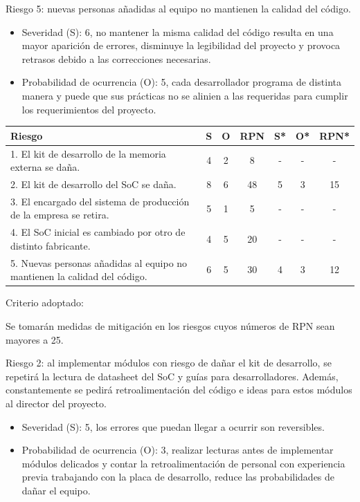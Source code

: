 \documentclass[
11pt, %
]{charter}
\begin{document}
Riesgo 5: nuevas personas añadidas al equipo no mantienen la calidad del código. 
\begin{itemize}
	\item Severidad (S): 6, no mantener la misma calidad del código resulta en una mayor aparición de errores, disminuye la legibilidad del proyecto y provoca retrasos debido a las correcciones necesarias.
	\item Probabilidad de ocurrencia (O): 5, cada desarrollador programa de distinta manera y puede que sus prácticas no se alinien a las requeridas para cumplir los requerimientos del proyecto.  
\end{itemize}

\begin{table}[htpb]
\centering
\begin{tabularx}{\linewidth}{@{}|X|c|c|c|c|c|c|@{}}
\hline
\rowcolor[HTML]{C0C0C0} 
Riesgo & S & O & RPN & S* & O* & RPN* \\ \hline
1. El kit de desarrollo de la memoria externa se daña.       & 4 &  2 & 8    & -   &  -  & -     \\ \hline
2. El kit de desarrollo del SoC se daña. & 8 & 6 & 48 &  5  &  3  &  15    \\ \hline
3. El encargado del sistema de producción de la empresa se retira.& 5 & 1 & 5  & -   & -   & -     \\ \hline
4. El SoC inicial es cambiado por otro de distinto fabricante. & 4 & 5 & 20 & -   & -   & -     \\ \hline
5. Nuevas personas añadidas al equipo no mantienen la calidad del código. & 6 & 5 & 30 & 4 & 3 & 12     \\ \hline
\end{tabularx}%
\end{table}

Criterio adoptado:

Se tomarán medidas de mitigación en los riesgos cuyos números de RPN sean mayores a 25.

Riesgo 2: al implementar módulos con riesgo de dañar el kit de desarrollo, se repetirá la lectura de datasheet del SoC y guías para desarrolladores. Además, constantemente se pedirá retroalimentación del código e ideas para estos módulos al director del proyecto.
\begin{itemize}
	\item Severidad (S): 5, los errores que puedan llegar a ocurrir son reversibles.  
	\item Probabilidad de ocurrencia (O): 3, realizar lecturas antes de implementar módulos delicados y contar la retroalimentación de personal con experiencia previa trabajando con la placa de desarrollo, reduce las probabilidades de dañar el equipo.
\end{itemize}
\end{document}
